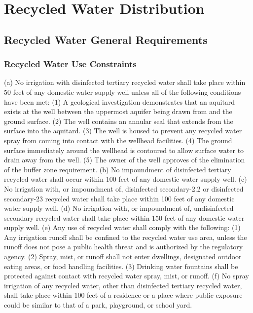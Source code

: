 
\chapter{Recycled Water Distribution}


\section{Recycled Water General Requirements} 
\subsection{Recycled Water Use Constraints} 
(a) No irrigation with disinfected tertiary recycled water shall take place within 50 feet of any domestic water supply well unless all of the following conditions have been met:
(1) A geological investigation demonstrates that an aquitard exists at the well between the uppermost aquifer being drawn from and the ground surface.
(2) The well contains an annular seal that extends from the surface into the aquitard.
(3) The well is housed to prevent any recycled water spray from coming into contact with the wellhead facilities.
(4) The ground surface immediately around the wellhead is contoured to allow surface water to drain away from the well.
(5) The owner of the well approves of the elimination of the buffer zone requirement.
(b) No impoundment of disinfected tertiary recycled water shall occur within 100 feet of any domestic water supply well.
(c) No irrigation with, or impoundment of, disinfected secondary-2.2 or disinfected secondary-23 recycled water shall take place within 100 feet of any domestic water supply well.
(d) No irrigation with, or impoundment of, undisinfected secondary recycled water shall take place within 150 feet of any domestic water supply well.
(e) Any use of recycled water shall comply with the following:
(1) Any irrigation runoff shall be confined to the recycled water use area, unless the runoff does not pose a public health threat and is authorized by the regulatory agency.
(2) Spray, mist, or runoff shall not enter dwellings, designated outdoor eating areas, or food handling facilities.
(3) Drinking water fountains shall be protected against contact with recycled water spray, mist, or runoff.
(f) No spray irrigation of any recycled water, other than disinfected tertiary recycled water, shall take place within 100 feet of a residence or a place where public exposure could be similar to that of a park, playground, or school yard.
